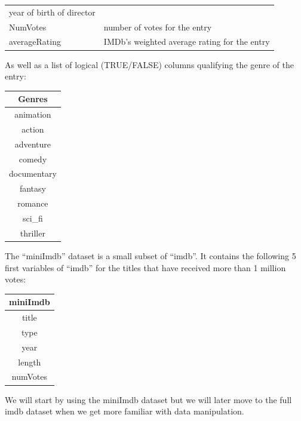 \documentclass[]{book}
\begin{document}
\begin{longtable}[]{@{}ll@{}}
\begin{minipage}[t]{0.82\columnwidth}
year of birth of director\strut
\end{minipage}\tabularnewline
\begin{minipage}[t]{0.12\columnwidth}\raggedright
NumVotes\strut
\end{minipage} & \begin{minipage}[t]{0.82\columnwidth}\raggedright
number of votes for the entry\strut
\end{minipage}\tabularnewline
\begin{minipage}[t]{0.12\columnwidth}\raggedright
averageRating\strut
\end{minipage} & \begin{minipage}[t]{0.82\columnwidth}\raggedright
IMDb's weighted average rating for the entry\strut
\end{minipage}\tabularnewline
\bottomrule
\end{longtable}

As well as a list of logical (TRUE/FALSE) columns qualifying the genre of the entry:

\begin{tabular}{c}
\toprule
Genres\\
\midrule
animation\\
action\\
adventure\\
comedy\\
documentary\\
\addlinespace
fantasy\\
romance\\
sci\_fi\\
thriller\\
\bottomrule
\end{tabular}

The ``miniImdb'' dataset is a small subset of ``imdb''. It contains the following 5 first variables of ``imdb'' for the titles that have received more than 1 million votes:

\begin{tabular}{c}
\toprule
miniImdb\\
\midrule
title\\
type\\
year\\
length\\
numVotes\\
\bottomrule
\end{tabular}

We will start by using the miniImdb dataset but we will later move to the full imdb dataset when we get more familiar with data manipulation.
\end{document}
